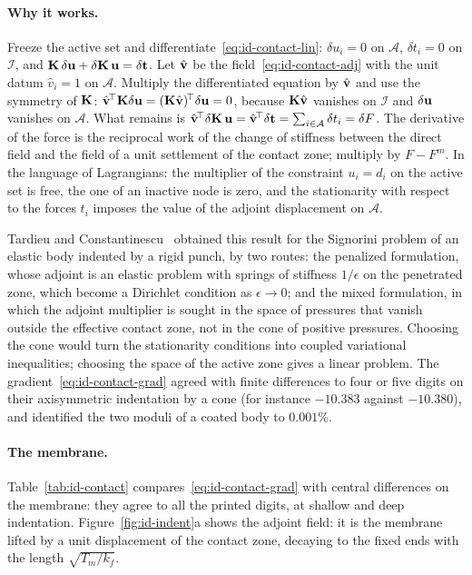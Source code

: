 \paragraph{Why it works.} Freeze the active set and differentiate~\eqref{eq:id-contact-lin}:
$\delta u_i=0$ on $\mathcal A$, $\delta t_i=0$ on $\mathcal I$, and
$\mathbf{K}\,\delta\mathbf{u}+\delta\mathbf{K}\,\mathbf{u}=\delta\mathbf{t}$. Let $\hat{\mathbf{v}}$ be the
field~\eqref{eq:id-contact-adj} with the unit datum $\hat v_i=1$ on $\mathcal A$.
Multiply the differentiated equation by $\hat{\mathbf{v}}$ and use the symmetry of $\mathbf{K}$:
$\hat{\mathbf{v}}^{\!\top}\mathbf{K}\delta\mathbf{u}=(\mathbf{K}\hat{\mathbf{v}})^{\!\top}\delta\mathbf{u}=0$, because
$\mathbf{K}\hat{\mathbf{v}}$ vanishes on $\mathcal I$ and $\delta\mathbf{u}$ vanishes on $\mathcal A$.
What remains is $\hat{\mathbf{v}}^{\!\top}\delta\mathbf{K}\,\mathbf{u}=\hat{\mathbf{v}}^{\!\top}\delta\mathbf{t}=\sum_{i\in\mathcal A}\delta t_i=\delta F$.
The derivative of the force is the reciprocal work of the change of stiffness
between the direct field and the field of a unit settlement of the contact zone;
multiply by $F-F^m$. In the language of Lagrangians: the multiplier of the
constraint $u_i=d_i$ on the active set is free, the one of an inactive node is
zero, and the stationarity with respect to the forces $t_i$ imposes the value of
the adjoint displacement on $\mathcal A$.

Tardieu and Constantinescu~\cite{TardieuConstantinescu2000} obtained this
result for the Signorini problem of an elastic body indented by a rigid punch,
by two routes: the penalized formulation, whose adjoint is an elastic problem
with springs of stiffness $1/\epsilon$ on the penetrated zone, which become a
Dirichlet condition as $\epsilon\to0$; and the mixed formulation, in which the
adjoint multiplier is sought in the space of pressures that vanish outside the
effective contact zone, not in the cone of positive pressures. Choosing the
cone would turn the stationarity conditions into coupled variational
inequalities; choosing the space of the active zone gives a linear problem. The
gradient~\eqref{eq:id-contact-grad} agreed with finite differences to four or
five digits on their axisymmetric indentation by a cone (for instance $-10.383$
against $-10.380$), and identified the two moduli of a coated body to $0.001\%$.

\paragraph{The membrane.}
Table~\ref{tab:id-contact} compares~\eqref{eq:id-contact-grad} with central
differences on the membrane: they agree to all the printed digits, at shallow and
deep indentation. Figure~\ref{fig:id-indent}a shows the adjoint field: it is
the membrane lifted by a unit displacement of the contact zone, decaying to the
fixed ends with the length $\sqrt{T_m/k_f}$.

